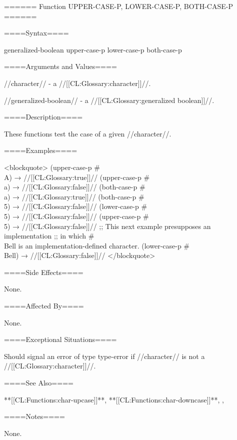 ====== Function UPPER-CASE-P, LOWER-CASE-P, BOTH-CASE-P ======

====Syntax====

 {generalized-boolean} {upper-case-p lower-case-p both-case-p}

====Arguments and Values====

//character// - a //[[CL:Glossary:character]]//.

//generalized-boolean// - a //[[CL:Glossary:generalized boolean]]//.

====Description====

These functions test the case of a given //character//.




====Examples====

<blockquote> (upper-case-p #\\A) → //[[CL:Glossary:true]]// (upper-case-p #\\a) → //[[CL:Glossary:false]]// (both-case-p #\\a) → //[[CL:Glossary:true]]// (both-case-p #\\5) → //[[CL:Glossary:false]]// (lower-case-p #\\5) → //[[CL:Glossary:false]]// (upper-case-p #\\5) → //[[CL:Glossary:false]]// ;; This next example presupposes an implementation ;; in which #\\Bell is an implementation-defined character. (lower-case-p #\\Bell) → //[[CL:Glossary:false]]// </blockquote>

====Side Effects====

None.

====Affected By====

None.

====Exceptional Situations====

Should signal an error of type type-error if //character// is not a //[[CL:Glossary:character]]//.

====See Also====

**[[CL:Functions:char-upcase]]**, **[[CL:Functions:char-downcase]]**, {\secref\CharactersWithCase}, {\secref\ImplementationDefinedScripts}

====Notes====

None.

